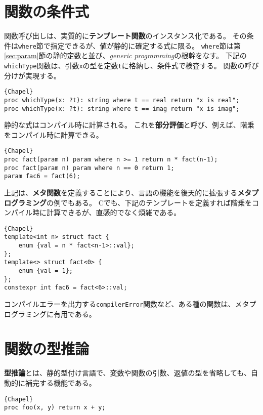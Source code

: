 \documentclass[10pt,a4paper]{book}
\newcommand{\Cpp}{C\raisebox{0.5ex}{\tiny\textbf{++}}}
\begin{document}
\section{関数の条件式}

関数呼び出しは、実質的に\textbf{テンプレート関数}のインスタンス化である。
その条件は\verb#where#節で指定できるが、値が静的に確定する式に限る。
\verb#where#節は第\ref{sec:param}節の静的定数と並び、\textit{generic programming}の根幹をなす。
下記の\verb#whichType#関数は、引数\verb#x#の型を定数\verb#t#に格納し、条件式で検査する。
関数の呼び分けが実現する。

\begin{Verbatim}{Chapel}
proc whichType(x: ?t): string where t == real return "x is real";
proc whichType(x: ?t): string where t == imag return "x is imag";
\end{Verbatim}

静的な式はコンパイル時に計算される。
これを\textbf{部分評価}と呼び、例えば、階乗をコンパイル時に計算できる。

\begin{Verbatim}{Chapel}
proc fact(param n) param where n >= 1 return n * fact(n-1);
proc fact(param n) param where n == 0 return 1;
param fac6 = fact(6);
\end{Verbatim}

上記は、\textbf{メタ関数}を定義することにより、言語の機能を後天的に拡張する\textbf{メタプログラミング}の例でもある。
\Cpp でも、下記のテンプレートを定義すれば階乗をコンパイル時に計算できるが、直感的でなく煩雑である。

\begin{Verbatim}{Chapel}
template<int n> struct fact {
	enum {val = n * fact<n-1>::val};
};
template<> struct fact<0> {
	enum {val = 1};
};
constexpr int fac6 = fact<6>::val;
\end{Verbatim}
\lstset{language=Chapel}

コンパイルエラーを出力する\verb#compilerError#関数など、ある種の関数は、メタプログラミングに有用である。

\section{関数の型推論}

\textbf{型推論}とは、静的型付け言語で、変数や関数の引数、返値の型を省略しても、自動的に補完する機能である。

\begin{Verbatim}{Chapel}
proc foo(x, y) return x + y;
\end{Verbatim}
\end{document}
